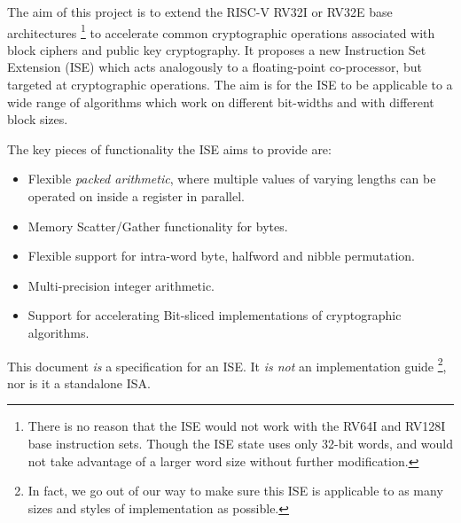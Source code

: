 

The aim of this project is to
extend the RISC-V RV32I or RV32E base architectures \footnote{
 There is no reason that the ISE would not work with the
 RV64I and RV128I base instruction sets. Though the ISE state
 uses only 32-bit words, and would not take advantage of a
 larger word size without further modification.
} to accelerate common cryptographic
operations associated with block ciphers and public key cryptography.
It proposes a new Instruction Set Extension (ISE)
which acts analogously to a floating-point co-processor,
but targeted at cryptographic operations.
The aim is for the ISE to be applicable to a wide range of algorithms
which work on different bit-widths and with different block sizes.

The key pieces of functionality the ISE aims to provide are:

\begin{itemize}
\item Flexible {\em packed arithmetic}, where multiple values of varying
    lengths can be operated on inside a register in parallel.
\item Memory Scatter/Gather functionality for bytes.
\item Flexible support for intra-word byte, halfword and nibble
      permutation.
\item Multi-precision integer arithmetic.
\item Support for accelerating Bit-sliced implementations of cryptographic
    algorithms.
\end{itemize}

This document {\em is} a specification for an ISE. It {\em is not} an
implementation guide \footnote{In fact, we go out of our way to make sure this
ISE is applicable to as many sizes and styles of implementation as possible.},
nor is it a standalone ISA.
